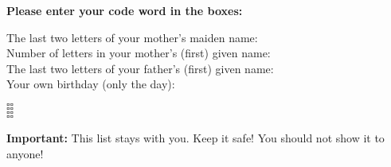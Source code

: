 \documentclass[11pt,twoside,a4paper]{article}
\begin{document}
\begin{mdframed}[
    linewidth=1pt,
    linecolor=black,
    skipabove=1em,
    skipbelow=1em,
    ]
    \textbf{Please enter your code word in the boxes:}

    \begin{minipage}{0.6\linewidth}
        The last two letters of your mother's maiden name:\\
        Number of letters in your mother's (first) given name:\\
        The last two letters of your father's (first) given name:\\
        Your own birthday (only the day):
    \end{minipage}
    \begin{minipage}{0.3\textwidth}
        $\square$$\square$\\
        $\square$$\square$\\
        $\square$$\square$\\
        $\square$$\square$
    \end{minipage}
\end{mdframed}

\begin{mdframed}[
    linewidth=1pt,
    linecolor=black,
    skipabove=1em,
    skipbelow=1em,
    ]
    \textbf{Important:}
    This list stays with you.
    Keep it safe!
    You should not show it to anyone!
\end{mdframed}
\end{document}
